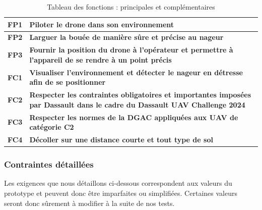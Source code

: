 \documentclass[a4paper,12pt,french]{report}
\begin{document}
\begin{table}[H]
    \centering
    \begin{tabularx}{14cm}{|c|p{12.25cm}|}
        \hline
        \textbf{FP1} & \textbf{Piloter le drone dans son environnement}                                                                                  \\
        \hline
        \textbf{FP2} & \textbf{Larguer la bouée de manière sûre et précise au nageur}                                                                    \\
        \hline
        \textbf{FP3} & \textbf{Fournir la position du drone à l’opérateur et permettre à l’appareil de se rendre à un point précis}                      \\
        \hline
        \textbf{FC1} & \textbf{Visualiser l’environnement et détecter le nageur en détresse afin de se positionner}                                      \\
        \hline
        \textbf{FC2} & \textbf{Respecter les contraintes obligatoires et importantes imposées par Dassault dans le cadre du Dassault UAV Challenge 2024} \\
        \hline
        \textbf{FC3} & \textbf{Respecter les normes de la DGAC appliquées aux UAV de catégorie C2}                                                       \\
        \hline
        \textbf{FC4} & \textbf{Décoller sur une distance courte et tout type de sol}                                                                     \\
        \hline
    \end{tabularx}
    \caption{Tableau des fonctions : principales et complémentaires}
\end{table}

\newpage
\subsubsection*{Contraintes détaillées}

Les exigences que nous détaillons ci-dessous correspondent aux valeurs du prototype et peuvent donc être imparfaites ou simplifiées. Certaines valeurs seront donc sûrement à modifier à la suite de nos tests.
\bigskip
\end{document}
